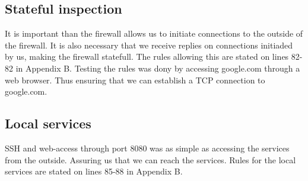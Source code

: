 \subsection{Stateful inspection}
It is important than the firewall allows us to initiate connections to the outside of the firewall. It is also necessary that we receive replies on connections initiaded by us, making the firewall statefull. The rules allowing this are stated on lines 82-82 in Appendix B. Testing the rules was dony by accessing google.com through a web browser. Thus ensuring that we can establish a TCP connection to google.com.

\subsection{Local services}
SSH and web-access through port 8080 was as simple as accessing the services from the outside. Assuring us that we can reach the services. Rules for the local services are stated on lines 85-88 in Appendix B.








